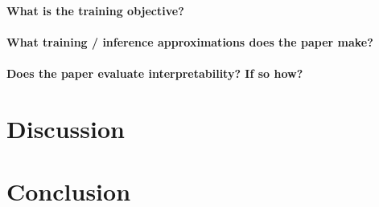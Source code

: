 \documentclass[11pt]{article}
\begin{document}
\paragraph{What is the training objective?}

\paragraph{What training / inference approximations does the paper make?}

\paragraph{Does the paper evaluate interpretability? If so how?}

\section{Discussion}

\section{Conclusion}



\end{document}
